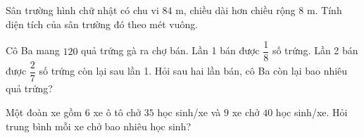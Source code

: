 \begin{ex} %
Sân trường hình chữ nhật có chu vi $84\text{ m}$, chiều dài hơn chiều rộng $8\text{ m}$. Tính diện tích của sân trường đó theo mét vuông.
\end{ex}

\begin{ex} %
Cô Ba mang $120$ quả trứng gà ra chợ bán. Lần 1 bán được $\dfrac{1}{8}$ số trứng. Lần 2 bán được $\dfrac{2}{7}$ số trứng còn lại sau lần 1. Hỏi sau hai lần bán, cô Ba còn lại bao nhiêu quả trứng?
\end{ex}

\begin{ex} %
Một đoàn xe gồm $6$ xe ô tô chở $35$ học sinh/xe và $9$ xe chở $40$ học sinh/xe. Hỏi trung bình mỗi xe chở bao nhiêu học sinh?
\end{ex}
